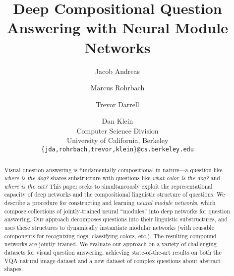 \documentclass[10pt,twocolumn,letterpaper]{article}
\begin{document}
\newcommand{\nmn}{Neural Module Networks\xspace}
\newcommand{\mod}[1]{{\small\texttt{#1}}}
\newcommand{\todo}{\textcolor{red}}
\newcommand{\shapes}{{\textsc{shapes}}\xspace}
\newcommand{\cocoqa}{{\textsc{CocoQA}}\xspace}
\newcommand{\marcus}[1]{\textcolor{blue}{Marcus: #1}}
\title{Deep Compositional Question Answering with Neural Module Networks}

\author{Jacob Andreas \and Marcus Rohrbach \and Trevor Darrell \and Dan Klein \\
Computer Science Division\\
University of California, Berkeley\\
{\tt\small \{jda,rohrbach,trevor,klein\}@cs.berkeley.edu}
}

\maketitle

\begin{abstract}
  Visual question answering is fundamentally compositional in nature---a
  question like \emph{where is the dog?} shares substructure with questions like
  \emph{what color is the dog?} and \emph{where is the cat?} This paper seeks to
  simultaneously exploit the representational capacity of deep networks and the
  compositional linguistic structure of questions.  We describe a procedure for
  constructing and learning \emph{neural module networks}, which compose
  collections of jointly-trained neural ``modules'' into deep networks for
  question answering. Our approach decomposes questions into their linguistic
  substructures, and uses these structures to dynamically instantiate modular
  networks (with reusable components for recognizing dogs, classifying colors,
  etc.). The resulting compound networks are jointly trained. We evaluate our
  approach on a variety of challenging datasets for visual question answering,
  achieving state-of-the-art results on both the VQA natural image dataset and a
  new dataset of complex questions about abstract shapes.
\end{abstract}






\end{document}

